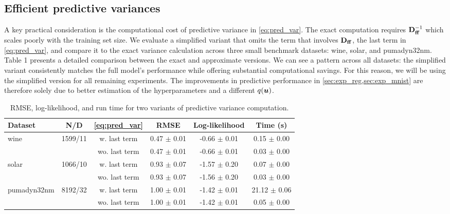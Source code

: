 \subsection{Efficient predictive variances}
A key practical consideration is the computational cost of predictive variance in \cref{eq:pred_var}. The exact computation requires $\mathbf{D}_{\mathbf{ff}}^{-1}$ which scales poorly with the training set size. We evaluate a simplified variant that omits the term that involves $\mathbf{D}_{\mathbf{ff}}$, the last term in \cref{eq:pred_var}, and compare it to the exact variance calculation across three small benchmark datasets: wine, solar, and pumadyn32nm.
Table 1 presents a detailed comparison between the exact and approximate versions. We can see a pattern across all datasets: the simplified variant consistently matches the full model's performance while offering substantial computational savings. For this reason, we will be using the simplified version for all remaining experiments. The improvements in predictive performance in \cref{sec:exp_reg,sec:exp_mnist} are therefore solely due to better estimation of the hyperparameters and a different $q({\bm{u}})$.
\label{sec:ablation_prediction}

\begin{table}[!ht]
\small
\centering
\begin{tabular}{lcc ccc}
\toprule
Dataset & N/D & \cref{eq:pred_var} & RMSE & Log-likelihood & Time (s) \\
\midrule
\multirow{2}{*}{wine} &
\multirow{2}{*}{1599/11}
 & w. last term & 0.47 $\pm$ 0.01 & -0.66 $\pm$ 0.01 & 0.15 $\pm$ 0.00 \\
 & & wo. last term & 0.47 $\pm$ 0.01 & -0.66 $\pm$ 0.01 & 0.03 $\pm$ 0.00 \\
\midrule
\multirow{2}{*}{solar} &
\multirow{2}{*}{1066/10}
 & w. last term & 0.93 $\pm$ 0.07 & -1.57 $\pm$ 0.20 & 0.07 $\pm$ 0.00 \\
 & & wo. last term & 0.93 $\pm$ 0.07 & -1.56 $\pm$ 0.20 & 0.03 $\pm$ 0.00 \\
\midrule
\multirow{2}{*}{pumadyn32nm} &
\multirow{2}{*}{8192/32}
 & w. last term & 1.00 $\pm$ 0.01 & -1.42 $\pm$ 0.01 & 21.12 $\pm$ 0.06 \\
 & & wo. last term & 1.00 $\pm$ 0.01 & -1.42 $\pm$ 0.01 & 0.05 $\pm$ 0.00 \\
\midrule
\bottomrule
\end{tabular}
\caption{RMSE, log-likelihood, and run time for two variants of predictive variance computation. }
\label{tab:results}
\end{table}

